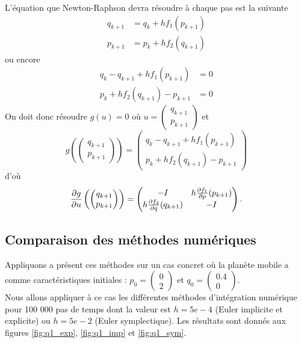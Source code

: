L'équation que Newton-Raphson devra résoudre à chaque pas est la suivante
\begin{align*}
  q_{k+1} & = q_k + hf_1(p_{k+1})\\
  p_{k+1} & = p_k + hf_2(q_{k+1})
\end{align*}
ou encore
\begin{align*}
  q_k - q_{k+1} + hf_1(p_{k+1}) & = 0\\
  p_k + hf_2(q_{k+1}) - p_{k+1} & = 0
\end{align*}
On doit donc résoudre $g(u) = 0$ où
$u =
\begin{pmatrix}
  q_{k+1}\\
  p_{k+1}
\end{pmatrix}$
et
\[
  g
  \left(
    \begin{pmatrix}
      q_{k+1}\\
      p_{k+1}
    \end{pmatrix}
  \right) =
  \begin{pmatrix}
    q_k - q_{k+1} + hf_1(p_{k+1})\\
    p_k + hf_2(q_{k+1}) - p_{k+1}
  \end{pmatrix}
\]
d'où
\[
  \frac{\partial g}{\partial u}
  \left(
    \begin{pmatrix}
      q_{k+1}\\
      p_{k+1}
    \end{pmatrix}
  \right) =
  \begin{pmatrix}
    -I & h\frac{\partial f_1}{\partial p}(p_{k+1})\\
    h\frac{\partial f_2}{\partial q}(q_{k+1}) & -I
  \end{pmatrix}.
\]


\subsection{Comparaison des méthodes numériques}

Appliquons a présent ces méthodes sur un cas concret où la planète mobile a comme caractéristiques initiales : $p_0 = \begin{pmatrix}
0\\
2
\end{pmatrix}
$ et $q_0 = \begin{pmatrix}
0.4\\
0
\end{pmatrix}
$.\\

Nous allons appliquer à ce cas les différentes méthodes d'intégration numérique pour 100 000 pas de temps dont la valeur est $h=5e-4$ (Euler implicite et explicite) ou $h=5e-2$ (Euler symplectique). Les résultats sont donnés aux figures \ref{fig:q1_exp}, \ref{fig:q1_imp} et \ref{fig:q1_sym}.

